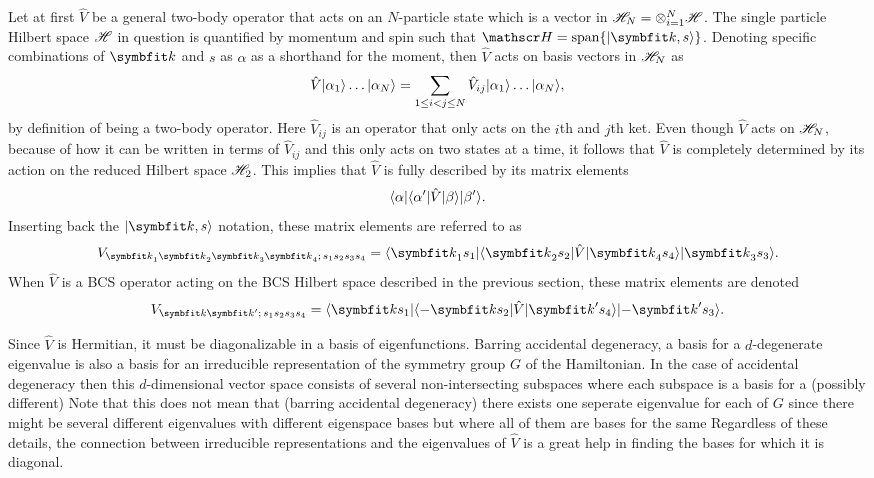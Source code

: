 Let at first $\hat{V}$ be a general two-body operator that acts on an $N$-particle state which is a vector in $\mathscr{H}_N = \otimes_{i=1}^N\mathscr{H}$. The
single particle Hilbert space $\mathscr{H}$ in question is quantified by momentum and spin such that $\hil=\Span\{\ket{\v{k},s}\}$. Denoting specific combinations
of $\v{k}$ and $s$ as $\alpha$ as a shorthand for the moment, then $\hat{V}$ acts on basis vectors in $\mathscr{H}_N$ as
\begin{equation}
    \label{eq:Group:Potential:twoBodyInteraction}
    \hat{V}\lvert \alpha_1 \rangle\ldots\lvert \alpha_N \rangle = \sum_{1\leq i<j\leq N}\hat{V}_{ij}\lvert \alpha_1 \rangle\ldots\lvert \alpha_N \rangle,
\end{equation}
by definition of being a two-body operator. Here $\hat{V}_{ij}$ is an operator that only acts on the $i$th and $j$th ket. Even though $\hat{V}$ acts on
$\mathscr{H}_N$, because of how it can be written in terms of $\hat{V}_{ij}$ and this only acts on two states at a time, it follows that $\hat{V}$ is
completely determined by its action on the reduced Hilbert space $\mathscr{H}_2$. This implies that $\hat{V}$ is fully described by its matrix elements
\begin{equation}
    \label{eq:Group:Potential:genTwoBodyMatrixElem}
    \langle \alpha \rvert\langle \alpha' \rvert\hat{V}\lvert \beta \rangle\lvert \beta' \rangle.
\end{equation}
Inserting back the $\ket{\v{k},s}$ notation, these matrix elements are referred to as
\begin{equation}
    \label{eq:Group:Potential:momSpinPotentialMatrixElems}
    V_{\v{k}_1\v{k}_2\v{k}_3\v{k}_4;\,s_1s_2s_3s_4} = \bra{\v{k}_1s_1}\bra{\v{k}_2s_2}\hat{V}\ket{\v{k}_4s_4}\ket{\v{k}_3s_3}.
\end{equation}
When $\hat{V}$ is a BCS operator acting on the BCS Hilbert space described in the previous section, these matrix elements are denoted
\begin{equation}
    \label{eq:Group:Potential:bcsTwoBodyMatrixElem}
    V_{\v{k}\v{k}';\,s_1s_2s_3s_4} = \bra{\v{k}s_1}\bra{-\v{k}s_2}\hat{V}\ket{\v{k}'s_4}\ket{-\v{k}'s_3}.
\end{equation}

Since $\hat{V}$ is Hermitian, it must be diagonalizable in a basis of eigenfunctions. Barring accidental degeneracy, a basis for a $d$-degenerate
eigenvalue is also a basis for an irreducible representation of the symmetry group $G$ of the Hamiltonian. In the case of accidental degeneracy
then this $d$-dimensional vector space consists of several non-intersecting subspaces where each subspace is a basis for a (possibly different) \irr Note
that this does not mean that (barring accidental degeneracy) there exists one seperate eigenvalue for each \irr of $G$ since there might be
several different eigenvalues with different eigenspace bases but where all of them are bases for the same \irr Regardless of these details,
the connection between irreducible representations and the eigenvalues of $\hat{V}$ is a great help in finding the bases for which it is
diagonal.

